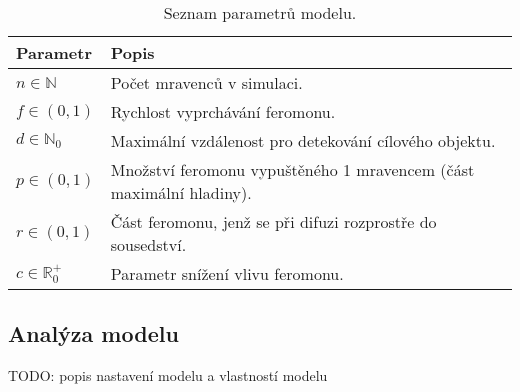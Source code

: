 \documentclass[10pt,a4paper,twocolumn]{article}
\begin{document}
\begin{table}[t]
  \centering %
  \begin{tabular}{l p{5cm}}
  \toprule
  Parametr & Popis \\
  \midrule
    $n \in \mathbb{N}$ & Počet mravenců v simulaci. \\ 
    $f \in (0, 1)$ & Rychlost vyprchávání feromonu. \\
    $d \in \mathbb{N}_0$ & Maximální vzdálenost pro detekování cílového objektu.\\
    $p \in (0, 1)$ & Množství feromonu vypuštěného 1 mravencem (část maximální hladiny).\\
    $r \in (0, 1)$ & Část feromonu, jenž se při difuzi rozprostře do sousedství. \\
    $c \in \mathbb{R}_0^{+}$ & Parametr snížení vlivu feromonu.\\ 
  \bottomrule
  \end{tabular}
  \caption{Seznam parametrů modelu.} \label{table:parametry} 
\end{table}

\subsection*{Analýza modelu}

TODO: popis nastavení modelu a vlastností modelu




\end{document}
